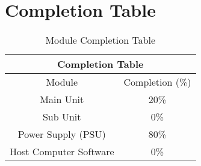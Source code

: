 \section{Completion Table}
\begin{table}[h]
 \begin{center}
  \begin{tabular}{|c|c|}
    \hline
    \multicolumn{2}{|c|}{Completion Table}\\
    \hline
    Module&Completion (\%)\\
    \hline
    Main Unit&20\%\\
    \hline
    Sub Unit&0\%\\
    \hline
    Power Supply (PSU)&80\%\\
    \hline
    Host Computer Software&0\%\\
    \hline
  \end{tabular}
 \end{center}
 \caption{Module Completion Table}
 \label{tab:comp-table}
\end{table}
